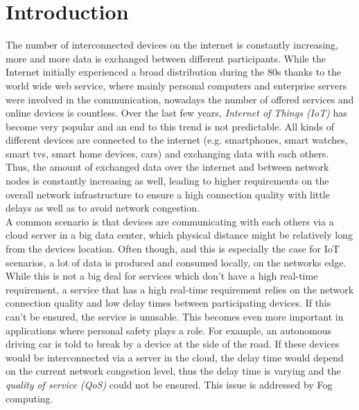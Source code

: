 \chapter{Introduction\label{cha:chapter1}}

The number of interconnected devices on the internet is constantly increasing, more and more data is exchanged between different participants. While the Internet initially experienced a broad distribution during the 80s thanks to the world wide web service, where mainly personal computers and enterprise servers were involved in the communication, nowadays the number of offered services and online devices is countless.
Over the last few years, \textit{Internet of Things (IoT)} has become very popular and an end to this trend is not predictable. All kinds of different devices are connected to the internet (e.g. smartphones, smart watches, smart tvs, smart home devices, cars) and exchanging data with each others.
Thus, the amount of exchanged data over the internet and between network nodes is constantly increasing as well, leading to higher requirements on the overall network infrastructure to ensure a high connection quality with little delays as well as to avoid network congestion.\\

A common scenario is that devices are communicating with each others via a cloud server in a big data center, which physical distance might be relatively long from the devices location.
Often though, and this is especially the case for IoT scenarios, a lot of data is produced and consumed locally, on the networks edge. While this is not a big deal for services which don’t have a high real-time requirement, a service that has a high real-time requirement relies on the network connection quality and low delay times between participating devices. If this can’t be ensured, the service is unusable. This becomes even more important in applications where personal safety plays a role. For example, an autonomous driving car is told to break by a device at the side of the road. If these devices would be interconnected via a server in the cloud, the delay time would depend on the current network congestion level, thus the delay time is varying and the \textit{quality of service (QoS)} could not be ensured. This issue is addressed by Fog computing.\\

